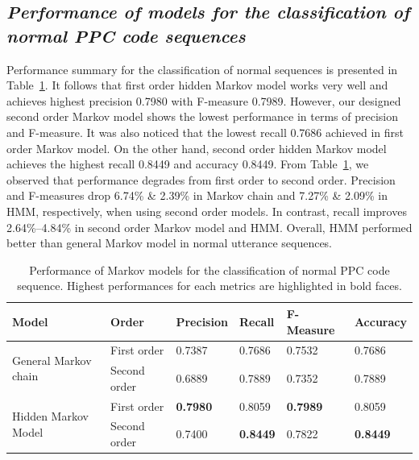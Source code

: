 \documentclass{amia}
\begin{document}
\subsection*{\textit{Performance of models for the classification of normal PPC code sequences}}
Performance summary for the classification of normal sequences is presented in Table~\ref{tab:result_norm_seq}. It follows that first order hidden Markov model works very well and achieves highest precision 0.7980 with F-measure 0.7989. However, our designed second order Markov model shows the lowest performance in terms of precision and F-measure. It was also noticed that the lowest recall 0.7686 achieved in first order Markov model. On the other hand, second order hidden Markov model achieves the highest recall 0.8449 and accuracy 0.8449. From Table~\ref{tab:result_norm_seq}, we observed that performance degrades from first order to second order. Precision and F-measures drop 6.74\% \& 2.39\% in Markov chain and 7.27\% \& 2.09\% in HMM, respectively, when using second order models. In contrast, recall improves 2.64\%--4.84\% in second order Markov model and HMM. Overall, HMM performed better than general Markov model in normal utterance sequences. \\

\begin{table}[h]
\centering
\caption{Performance of Markov models for the classification of normal PPC code sequence. Highest performances for each metrics are highlighted in bold faces.}
\label{tab:result_norm_seq}
  \begin{tabular}{|l|l|l|l|l|l|}
  \hline
   \textbf{Model} & \textbf{Order}  & \textbf{Precision}  & \textbf{Recall} & \textbf{F-Measure} & \textbf{Accuracy}\\ \hline    
    
 \multirow{2}{*}{General Markov chain} & First order & 0.7387 & 0.7686 & 0.7532 & 0.7686\\\cline{2-6}
 & Second order & 0.6889 & 0.7889 & 0.7352 & 0.7889\\ \hline
 \multirow{2}{*}{Hidden Markov Model} & First order & \textbf{0.7980} & 0.8059 & \textbf{0.7989} & 0.8059\\ \cline{2-6}
 & Second order & 0.7400 & \textbf{0.8449} & 0.7822  & \textbf{0.8449}\\ \hline
 
  \end{tabular}
\end{table} 
\end{document}
